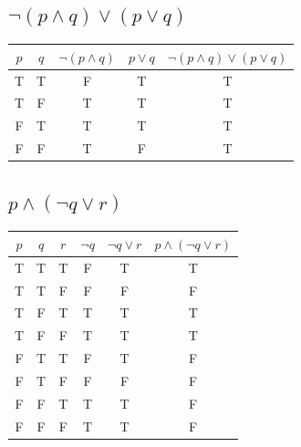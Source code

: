 \documentclass[a4paper, 10pt]{article}
\begin{document}
        \subsection{\( \neg (p \land q) \lor (p \lor q) \)}
            \begin{tabular}{|c|c|c|c|c|}
                \hline
                $p$ & $q$ & $\neg (p \land q)$ & $p \lor q$ & $\neg (p \land q) \lor (p \lor q)$ \\ \hline
                T   & T   & F                  & T          & T                              \\ \hline
                T   & F   & T                  & T          & T                              \\ \hline
                F   & T   & T                  & T          & T                              \\ \hline
                F   & F   & T                  & F          & T                              \\ \hline
            \end{tabular}

        \subsection{\( p \land (\neg q \lor r) \)}
            \begin{tabular}{|c|c|c|c|c|c|}
                \hline
                $p$ & $q$ & $r$ & $\neg q$ & $\neg q \lor r$ & $p \land (\neg q \lor r)$ \\ \hline
                T   & T   & T   & F        & T               & T                         \\ \hline
                T   & T   & F   & F        & F               & F                         \\ \hline
                T   & F   & T   & T        & T               & T                         \\ \hline
                T   & F   & F   & T        & T               & T                         \\ \hline
                F   & T   & T   & F        & T               & F                         \\ \hline
                F   & T   & F   & F        & F               & F                         \\ \hline
                F   & F   & T   & T        & T               & F                         \\ \hline
                F   & F   & F   & T        & T               & F                         \\ \hline
            \end{tabular}
    \pagebreak
\end{document}
